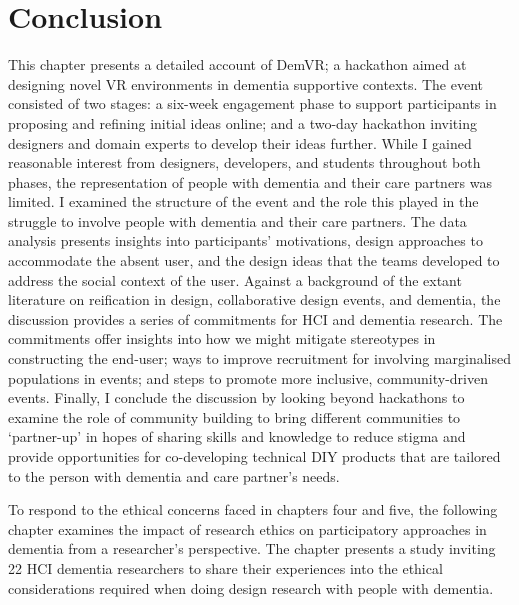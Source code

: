 \section{Conclusion}
\label{sec:Conclusion}
This chapter presents a detailed account of DemVR; a hackathon aimed at designing novel VR environments in dementia supportive contexts. The event consisted of two stages: a six-week engagement phase to support participants in proposing and refining initial ideas online; and a two-day hackathon inviting designers and domain experts to develop their ideas further. While I gained reasonable interest from designers, developers, and students throughout both phases, the representation of people with dementia and their care partners was limited. I examined the structure of the event and the role this played in the struggle to involve people with dementia and their care partners. The data analysis presents insights into participants’ motivations, design approaches to accommodate the absent user, and the design ideas that the teams developed to address the social context of the user. Against a background of the extant literature on reification in design, collaborative design events, and dementia, the discussion provides a series of commitments for HCI and dementia research. The commitments offer insights into how we might mitigate stereotypes in constructing the end-user; ways to improve recruitment for involving marginalised populations in events; and steps to promote more inclusive, community-driven events. Finally, I conclude the discussion by looking beyond hackathons to examine the role of community building to bring different communities to ‘partner-up’ in hopes of sharing skills and knowledge to reduce stigma and provide opportunities for co-developing technical DIY products that are tailored to the person with dementia and care partner’s needs.

To respond to the ethical concerns faced in chapters four and five, the following chapter examines the impact of research ethics on participatory approaches in dementia from a researcher's perspective. The chapter presents a study inviting 22 HCI dementia researchers to share their experiences into the ethical considerations required when doing design research with people with dementia.



